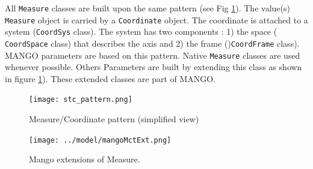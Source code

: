 \documentclass[11pt,a4paper]{ivoa}
\begin{document}
All \texttt{Measure} classes are built upon the same pattern (see Fig \ref{fig:stcpattern}). 
The value(s) \texttt{Measure} object is carried by a \texttt{Coordinate} object. 
The coordinate is attached to a system  (\texttt{CoordSys} class). 
The system has two components : 1) the space  ( \texttt{CoordSpace} class) that describes the axis and 2) the frame ()\texttt{CoordFrame} class).  
MANGO parameters are based on this pattern. 
Native  \texttt{Measure} classes are used whenever possible. 
Others Parameters are built by extending this class as shown in figure \ref{fig:stcpattern}). 
These extended classes are part of MANGO.
\begin{figure}
     \texttt{[image: stc\_pattern.png]}
     \caption{Measure/Coordinate pattern (simplified view)}
     \label{fig:stcpattern}
\end{figure}

\begin{figure}
  \texttt{[image: ../model/mangoMctExt.png]}
  \caption{Mango extensions of Measure.}
  \label{fig:stcextension}
\end{figure}
\end{document}
